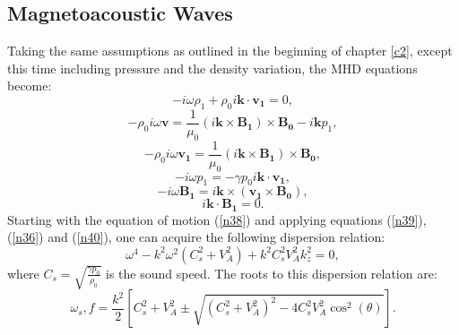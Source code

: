 \documentclass[12pt,a4paper,twoside]{article}
\begin{document}
\subsection{Magnetoacoustic Waves} 
Taking the same assumptions as outlined in the beginning of chapter \ref{c2}, except this time including pressure and the density variation, the MHD equations become: 
\begin{equation}\label{n41}
-i \omega \rho_1+ \rho_0 i \boldsymbol{k} \cdot \boldsymbol{v_1} = 0,
\end{equation}
\begin{equation}\label{n37}
- \rho_0 i \omega \boldsymbol{v} = \frac{1}{\mu_0} (i \boldsymbol{k} \times \boldsymbol{B_1}) \times \boldsymbol{B_0}-i \boldsymbol{k} p_1,
\end{equation}
\begin{equation}\label{n38}
- \rho_0 i \omega \boldsymbol{v_1} = \frac{1}{\mu_0} (i \boldsymbol{k} \times \boldsymbol{B_1}) \times \boldsymbol{B_0},
\end{equation}
\begin{equation}\label{n42}
-i \omega p_1 = - \gamma p_0 i \boldsymbol{k} \cdot \boldsymbol{v_1},
\end{equation}
\begin{equation}\label{n39}
-i \omega \boldsymbol{B_1} = i \boldsymbol{k} \times (\boldsymbol{v_1} \times \boldsymbol{B_0}),
\end{equation}
\begin{equation}\label{n40}
i \boldsymbol{k} \cdot \boldsymbol{B_1} = 0.
\end{equation}
Starting with the equation of motion (\ref{n38}) and applying equations (\ref{n39}),(\ref{n36}) and (\ref{n40}), one can acquire the following dispersion relation: 
\begin{equation}
 \omega^4-k^2\omega^2(C_s^2+V_A^2)+k^2 C^2_s V^2_A k^2_z = 0,
\end{equation} 
where $C_s=\sqrt{\frac{\gamma p_0}{\rho_0}}$ is the sound speed. The roots to this dispersion relation are: 
\begin{equation}\label{n30}
\omega_s,f = \frac{k^2}{2} \left[ C_s^2+V^2_A \pm \sqrt{(C^2_s+V^2_A)^2-4C^2_s V^2_A \cos^2(\theta)} \right] .
\end{equation}
\end{document}
